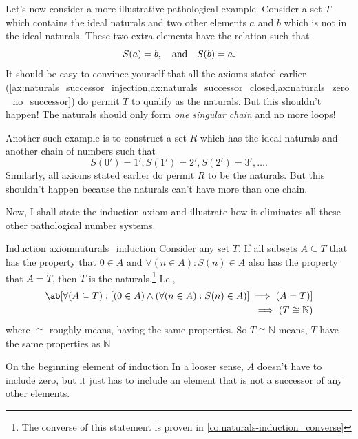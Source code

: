 Let's now consider a more illustrative pathological example. Consider a set \(T\) which contains the
ideal naturals and two other elements \(a\) and \(b\) which is not in the ideal naturals. These two
extra elements have the relation such that
\begin{equation}
  S(a) = b, \quad\textrm{and}\quad S(b) = a.
\end{equation}
It should be easy to convince yourself that all the axioms stated earlier
(\cref{ax:naturals_successor_injection,ax:naturals_successor_closed,ax:naturals_zero_no_successor})
do permit \(T\) to qualify as the naturals. But this shouldn't happen! The naturals should only form
\emph{one singular chain} and no more loops!

Another such example is to construct a set \(R\) which has the ideal naturals and another chain of
numbers such that
\begin{equation}
  S(0') = 1', S(1') = 2', S(2') = 3', \dots.
\end{equation}
Similarly, all axioms stated earlier do permit \(R\) to be the naturals. But this shouldn't happen
because the naturals can't have more than one chain.

Now, I shall state the induction axiom and illustrate how it eliminates all these other pathological
number systems.

\begin{axiom}{Induction axiom}{naturals_induction}
  Consider any set \(T\). If all subsets \(A \subseteq T\) that has the property that \(0 \in A\)
  and \(\forall (n \in A) : S(n) \in A\) also has the property that \(A = T\), then \(T\) is the
  naturals.\footnote{The converse of this statement is proven in
  \cref{co:naturals-induction_converse}} I.e.,
  \begin{equation*}
    \begin{aligned}
      \ab[\forall (A \subseteq T) : [(0 \in A) \land (\forall (n \in A) : S(n) \in A)] \implies (A = T)] \\
      \implies (T \cong \mathbb{N})
    \end{aligned}
  \end{equation*}
  where \(\cong\) roughly means, having the same properties. So \(T \cong \mathbb{N}\) means, \(T\)
  have the same properties as \(\mathbb{N}\)
   
\end{axiom}

\begin{remark}{On the beginning element of induction}{}
  In a looser sense, \(A\) doesn't have to include zero, but it just has to include an element that
  is not a successor of any other elements.
\end{remark}

